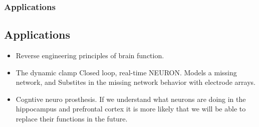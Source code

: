 \documentclass{beamer}
\begin{document}

\begin{frame}
\frametitle{Applications}
\subsection{Applications}
\begin{itemize}

\vfill \item Reverse engineering principles of brain function.

\vfill \item The dynamic clamp Closed loop, real-time NEURON. Models a missing network, and Substites in the missing network behavior with electrode arrays. 

\vfill \item Cogntive neuro prosthesis. If we understand what neurons are doing in the hippocampus and prefrontal cortex it is more likely that we will be able to replace their functions in the future.
 

\end{itemize}
\end{frame}



\end{document}
